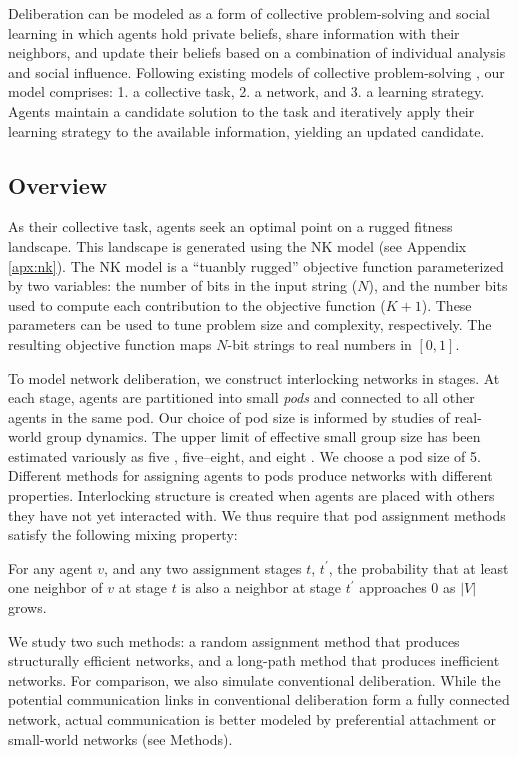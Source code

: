 Deliberation can be modeled as a form of collective problem-solving and social learning in which agents hold private beliefs, share information with their neighbors, and update their beliefs based on a combination of individual analysis and social influence.
Following existing models of collective problem-solving \cite{lazer_network_2007, barkoczi_social_2016, gomez_clustering_2019}, our model comprises: 1. a collective task, 2. a network, and 3. a learning strategy.
Agents maintain a candidate solution to the task and iteratively apply their learning strategy to the available information, yielding an updated candidate.


\subsection{Overview}

As their collective task, agents seek an optimal point on a rugged fitness landscape.
This landscape is generated using the NK model \cite{kauffman_towards_1987, weinberger_local_1991} (see Appendix \ref{apx:nk}).
The NK model is a ``tuanbly rugged'' objective function parameterized by two variables:
the number of bits in the input string ($N$),
and the number bits used to compute each contribution to the objective function ($K+1$).
These parameters can be used to tune problem size and complexity, respectively.
The resulting objective function maps $N$-bit strings to real numbers in $[0,1]$.

To model network deliberation, we construct interlocking networks in stages. At each stage, agents are partitioned into small {\em pods} and connected to all other agents in the same pod.
Our choice of pod size is informed by studies of real-world group dynamics.
The upper limit of effective small group size has been estimated variously as five \cite{freeman_tyranny_1972}, five--eight\cite{lohman_designing_2000}, and eight \cite{miflin_small_2004}.
We choose a pod size of 5.
Different methods for assigning agents to pods produce networks with different properties.
Interlocking structure is created when agents are placed with others they have not yet interacted with.
We thus require that pod assignment methods satisfy the following mixing property:
\begin{property}
\label{prop:mixing}
For any agent $v$, and any two assignment stages $t$, $t^\prime$, the probability that at least one neighbor of $v$ at stage $t$ is also a neighbor at stage $t^\prime$ approaches 0 as $|V|$ grows.
\end{property}
We study two such methods: a random assignment method that produces structurally efficient networks, and a long-path method that produces inefficient networks. For comparison, we also simulate conventional deliberation. While the potential communication links in conventional deliberation form a fully connected network, actual communication is better modeled by preferential attachment \cite{barabasi_emergence_1999} or small-world \cite{watts_collective_1998} networks (see Methods).

